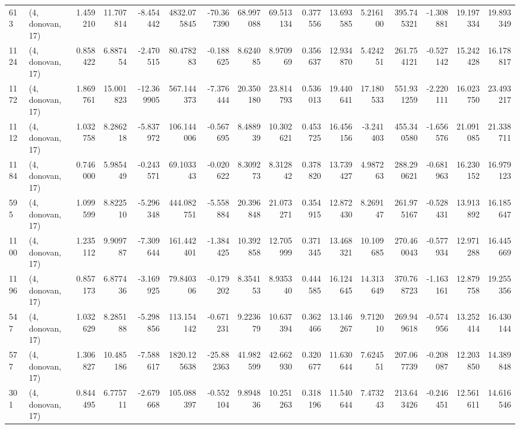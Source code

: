\begin{tabular}{llrrrrrrrrrrrrrr}
613  &  (4, donovan, 17) &   1.459210 &  11.707814 &  -8.454442 &   4832.075845 &  -70.367390 &   68.997088 &   69.513134 &  0.377556 &  13.693585 &   5.216100 &   395.745321 &  -1.308881 &  19.197334 &  19.893349 \\
1124 &  (4, donovan, 17) &   0.858422 &   6.887454 &  -2.470515 &     80.478283 &   -0.188625 &    8.624085 &    8.970969 &  0.356637 &  12.934870 &   5.424251 &   261.754121 &  -0.527142 &  15.242428 &  16.178817 \\
1172 &  (4, donovan, 17) &   1.869761 &  15.001823 & -12.369905 &    567.144373 &   -7.376444 &   20.350180 &   23.814793 &  0.536013 &  19.440641 &  17.180533 &   551.931259 &  -2.220111 &  16.023750 &  23.493217 \\
1112 &  (4, donovan, 17) &   1.032758 &   8.286218 &  -5.837972 &    106.144006 &   -0.567695 &    8.488939 &   10.302621 &  0.453725 &  16.456156 &  -3.241403 &   455.340580 &  -1.656576 &  21.091085 &  21.338711 \\
1184 &  (4, donovan, 17) &   0.746000 &   5.985449 &  -0.243571 &     69.103343 &   -0.020622 &    8.309273 &    8.312842 &  0.378820 &  13.739427 &   4.987263 &   288.290621 &  -0.681963 &  16.230152 &  16.979123 \\
595  &  (4, donovan, 17) &   1.099599 &   8.822510 &  -5.296348 &    444.082751 &   -5.558884 &   20.396848 &   21.073271 &  0.354915 &  12.872430 &   8.269147 &   261.975167 &  -0.528431 &  13.913892 &  16.185647 \\
1100 &  (4, donovan, 17) &   1.235112 &   9.909787 &  -7.309644 &    161.442401 &   -1.384425 &   10.392858 &   12.705999 &  0.371345 &  13.468321 &  10.109685 &   270.460043 &  -0.577934 &  12.971288 &  16.445669 \\
1196 &  (4, donovan, 17) &   0.857173 &   6.877436 &  -3.169925 &     79.840306 &   -0.179202 &    8.354153 &    8.935340 &  0.444585 &  16.124645 &  14.313649 &   370.768723 &  -1.163161 &  12.879758 &  19.255356 \\
547  &  (4, donovan, 17) &   1.032629 &   8.285188 &  -5.298856 &    113.154142 &   -0.671231 &    9.223679 &   10.637394 &  0.362466 &  13.146267 &   9.712010 &   269.949618 &  -0.574956 &  13.252414 &  16.430144 \\
577  &  (4, donovan, 17) &   1.306827 &  10.485186 &  -7.588617 &   1820.125638 &  -25.882363 &   41.982599 &   42.662930 &  0.320677 &  11.630644 &   7.624551 &   207.067739 &  -0.208087 &  12.203850 &  14.389848 \\
301  &  (4, donovan, 17) &   0.844495 &   6.775711 &  -2.679668 &    105.088397 &   -0.552104 &    9.894836 &   10.251263 &  0.318196 &  11.540644 &   7.473243 &   213.643426 &  -0.246451 &  12.561611 &  14.616546 \\

\end{tabular}
